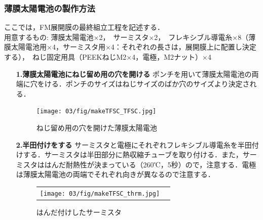 \subsubsection*{薄膜太陽電池の製作方法}
ここでは，FM展開膜の最終組立工程を記述する．\\
用意するもの:
薄膜太陽電池×2，　サーミスタ×2，　フレキシブル導電糸×8（薄膜太陽電池用×4，サーミスタ用×4：それぞれの長さは，展開膜上に配置し決定する），　ねじ固定用具（PEEKねじM2×4，電極，M2ナット）×4
\begin{itemize}
	\item[\textbf{1.薄膜太陽電池にねじ留め用の穴を開ける}]
	ポンチを用いて薄膜太陽電池の両端に穴をける．ポンチのサイズはねじサイズのばか穴のサイズより決定される．
	\begin{figure}[H]
		\centering
		\texttt{[image: 03/fig/makeTFSC\_TFSC.jpg]}
		\caption{ねじ留め用の穴を開けた薄膜太陽電池}
		\label{fig3-9-3-3}
	\end{figure}
	\item[\textbf{2.半田付けをする}]
	サーミスタと電極にそれぞれフレキシブル導電糸を半田付けする．サーミスタは半田部分に熱収縮チューブを取り付ける．また，サーミスタははんだ耐熱性が決まっている（260℃，5秒）ので，注意する．電極は薄膜太陽電池の両端でそれぞれ向きが異なるので注意する．
	\begin{figure}[H]
		\begin{tabular}{cc}
			\begin{minipage}[t]{0.45\hsize}
				\centering
				\texttt{[image: 03/fig/makeTFSC\_thrm.jpg]}
				\caption{はんだ付けしたサーミスタ}
				\label{fig3-9-3-4}
			\end{minipage} &
		

\end{tabular}
\end{figure}
\end{itemize}
